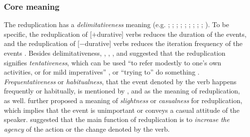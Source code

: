 \subsubsection{Core meaning}\label{sec:core-sem}

The reduplication has a \textit{delimitativeness} meaning (e.g. \citealt[204--205]{Chao1968}; \citealt[29]{LiThompson1981};  \citealt[14]{Li1996}; \citealt[67]{Dai1997};  \citealt[382--383]{Zhu1998}; \citealt[420--421]{Xing2000}; \citealt[48]{Chen2001};  \citealt[288]{Tsao2001}; \citealt[11--12]{Yang2003}; \citealt[Sec. 4.3]{XiaoMcEnery2004}). 
To be specific, the reduplication of [$+$durative] verbs reduces the duration of the events,
and the reduplication of [$-$durative] verbs reduces the iteration frequency of the events \citetext{\citealp[14]{Li1996}; \citealp[149--150]{XiaoMcEnery2004}}.
Besides delimitativeness, \citet{Chao1968}, \citet{Fan1964}, \citet{Li1996}, \citet{Smith1991, Smith1994} and \citet{Tsao2001} suggested that the reduplication signifies \textit{tentativeness}, which can be used
``to refer modestly to one's own activities, or for mild imperatives'' \citep[356]{Smith1991}, or ``trying to'' do something \citep[234]{LiThompson1981}.
\textit{Frequentativeness} or \textit{habitualness}, that the event denoted by the verb happens frequently or habitually, is mentioned by \citet{Fan1964}, \citet{Li1996} and \citet{Qian2000} as the meaning of reduplication, as well.
 \citet{Fan1964} further proposed a meaning of \textit{slightness} or \textit{casualness} for reduplication, which implies that the event is unimportant or conveys a casual attitude of the speaker.
 \citet{Zhu1998} suggested that the main function of reduplication is to \textit{increase the agency} of the action or the change denoted by the verb.


